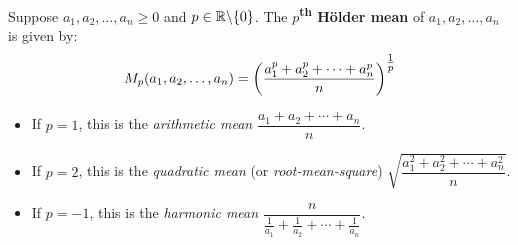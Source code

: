 \documentclass[main.tex]{subfiles}
\begin{document}
\begin{definition}
    Suppose $a_1,a_2,\ldots,a_n\ge0$ and $p\in\R\exc\{0\}$. The \textbf{$p$\textsuperscript{th} Hölder mean} of $a_1,a_2,\ldots,a_n$ is given by:
    \begin{equation*}
        M_p(a_1,a_2,\ldots,a_n)
        = \qty(\frac{a_1^p+a_2^p+\cdots+a_n^p}{n})^{\tfrac{1}{p}}
    \end{equation*}
\end{definition}

\begin{examples}\leavevmode
    \begin{itemize}
        \item If $p=1$, this is the \emph{arithmetic mean} $\dfrac{a_1+a_2+\cdots+a_n}{n}$.
        \item If $p=2$, this is the \emph{quadratic mean} (or \emph{root-mean-square}) $\sqrt{\dfrac{a_1^2+a_2^2+\cdots+a_n^2}{n}}$.
        \item If $p=-1$, this is the \emph{harmonic mean} $\dfrac{n}{\frac{1}{a_1}+\frac{1}{a_2}+\cdots+\frac{1}{a_n}}$.
    \end{itemize}
\end{examples}
\end{document}
